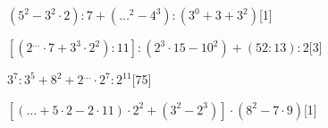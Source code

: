 \begin{esercizio} %
\((5^2-3^2\cdot2):7+({\dots}^2-4^3):(3^0+3+3^2)\)\hfill[1]
\end{esercizio}
\begin{esercizio} %
\([(2^{\dots}\cdot7+3^3\cdot2^2):11]:(2^3\cdot15-10^2)+(52:13):2\)\hfill[3]
\end{esercizio}
\begin{esercizio} %
\(3^7:3^5+8^2+2^{\dots}\cdot2^7:2^{11}\)\hfill[75]
\end{esercizio}
\begin{esercizio} %
\([({\dots}+5\cdot2-2\cdot11)\cdot2^2+(3^2-2^3)]\cdot(8^2-7\cdot9)\)\hfill[1]
\end{esercizio}

